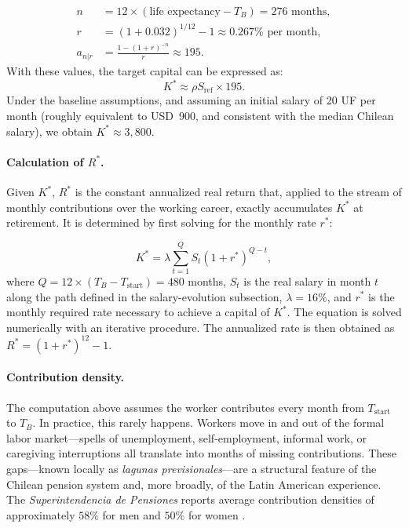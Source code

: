 \documentclass[11pt]{article}
\newcommand{\Rstar}{R^{*}}
\newcommand{\Kstar}{K^{*}}
\newcommand{\TB}{T_{B}}
\begin{document}
\begin{align}
n &= 12 \times (\text{life expectancy} - \TB) = 276 \text{ months}, \\
r &= (1+0.032)^{1/12}-1 \approx 0.267\% \text{ per month}, \\
a_{n|r} &= \frac{1-(1+r)^{-n}}{r} \approx 195.
\end{align}
With these values, the target capital can be expressed as:
\begin{equation}
\Kstar \approx \rho S_{\mathrm{ref}} \times 195.
\end{equation}
Under the baseline assumptions, and assuming an initial salary 
of 20 UF per month  (roughly equivalent to USD~900, and 
consistent with the median Chilean salary), we obtain 
$K^* \approx 3{,}800$.
\paragraph{Calculation of $\Rstar$.}
Given $\Kstar$, $\Rstar$ is the constant annualized real return that, applied to the stream of monthly contributions over the working career, exactly accumulates $\Kstar$ at retirement. It is determined by first solving for the monthly rate $r^*$:
 
\begin{equation}
K^* = \lambda \sum_{t=1}^{Q} S_t (1 + r^*)^{Q-t},
\end{equation}
where $Q = 12 \times (T_B - T_{\text{start}}) = 480$ months, $S_t$ is 
the real salary in month $t$ along the path defined in the 
salary-evolution subsection, $\lambda = 16\%$, and $r^*$ is the monthly 
required rate necessary to achieve a capital of $K^*$.
The equation is solved numerically with an iterative procedure. The annualized rate is then obtained as $\Rstar = (1+r^*)^{12}-1$.
 
 
 
 
\paragraph{Contribution density.}
 
The computation above assumes the worker contributes every month 
from $T_{\text{start}}$ to $T_B$. In practice, this rarely happens. 
Workers move in and out of the formal labor market---spells of 
unemployment, self-employment, informal work, or caregiving 
interruptions all translate into months of missing contributions. 
These gaps---known locally as \textit{lagunas previsionales}---are 
a structural feature of the Chilean pension system and, more 
broadly, of the Latin American experience. The \textit{Superintendencia de 
Pensiones} reports average contribution densities of approximately 
$58\%$ for men and $50\%$ for women \cite{sp2024ficha}.
 
\end{document}

